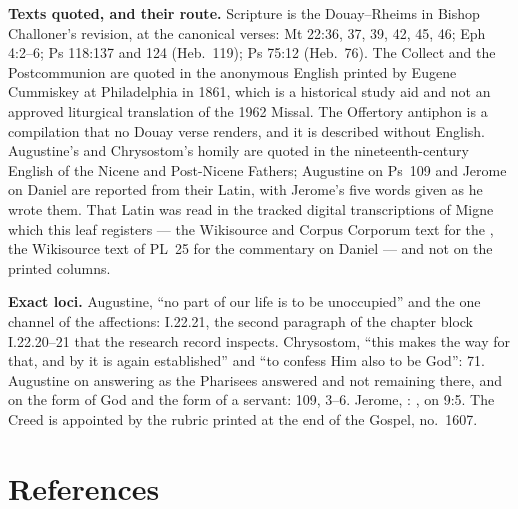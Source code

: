 {\textbf{Texts quoted, and their route.} Scripture is the Douay--Rheims in
Bishop Challoner's revision, at the canonical verses: Mt 22:36, 37, 39, 42,
45, 46; Eph 4:2--6; Ps 118:137 and 124 (Heb.\ 119); Ps 75:12 (Heb.\ 76). The
Collect and the Postcommunion are quoted in the anonymous English printed by
Eugene Cummiskey at Philadelphia in 1861, which is a historical study aid and
not an approved liturgical translation of the 1962 Missal. The Offertory
antiphon is a compilation that no Douay verse renders, and it is described
without English. Augustine's  and
Chrysostom's homily are quoted in the nineteenth-century English of the Nicene
and Post-Nicene Fathers; Augustine on Ps~109 and Jerome on Daniel are reported
from their Latin, with Jerome's five words given as he wrote them. That Latin
was read in the tracked digital transcriptions of Migne which this leaf
registers --- the Wikisource and Corpus Corporum text for the
, the Wikisource text of PL~25 for the commentary on
Daniel --- and not on the printed columns.

\textbf{Exact loci.} Augustine, ``no part of our life is to be unoccupied''
and the one channel of the affections:  I.22.21,
the second paragraph of the chapter block I.22.20--21 that the research
record inspects. Chrysostom, ``this makes the way for
that, and by it is again established'' and ``to confess Him also to be God'':
 71. Augustine on answering as the Pharisees
answered and not remaining there, and on the form of God and the form of a
servant:  109, 3--6. Jerome, : , on 9:5. The Creed is appointed by
the rubric printed at the end of the Gospel, no.~1607.

\par}

\section*{References}

